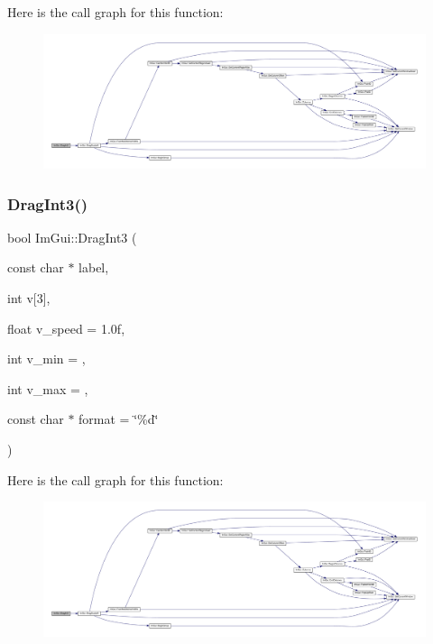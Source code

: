 Here is the call graph for this function\+:
\nopagebreak
\begin{figure}[H]
\begin{center}
\leavevmode
\includegraphics[width=350pt]{namespace_im_gui_a8a1121ff004dbc90c2c81b04e6623429_cgraph}
\end{center}
\end{figure}
\mbox{\label{namespace_im_gui_a2bc8e645a1569dcb657d02f97041adda}} 
\subsubsection{\texorpdfstring{Drag\+Int3()}{DragInt3()}}
{\footnotesize\ttfamily bool Im\+Gui\+::\+Drag\+Int3 (\begin{DoxyParamCaption}\item[{const char $\ast$}]{label,  }\item[{int}]{v\mbox{[}3\mbox{]},  }\item[{float}]{v\+\_\+speed = {\ttfamily 1.0f},  }\item[{int}]{v\+\_\+min = {},  }\item[{int}]{v\+\_\+max = {},  }\item[{const char $\ast$}]{format = {\ttfamily \char`\"{}\%d\char`\"{}} }\end{DoxyParamCaption})}

Here is the call graph for this function\+:
\nopagebreak
\begin{figure}[H]
\begin{center}
\leavevmode
\includegraphics[width=350pt]{namespace_im_gui_a2bc8e645a1569dcb657d02f97041adda_cgraph}
\end{center}
\end{figure}
\mbox{\label{namespace_im_gui_a67acd6e50be3c7091fbc4c21d829e2e0}} 
